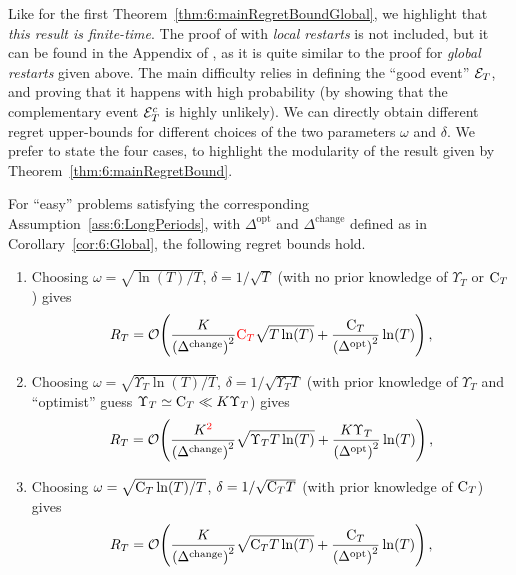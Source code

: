 Like for the first Theorem~\ref{thm:6:mainRegretBoundGlobal},
we highlight that \emph{this result is finite-time}.
The proof of \GLRklUCB{} with \emph{local restarts} is not included, but it can be found in the Appendix of \cite{Besson2019GLRT}, as it is quite similar to the proof for \emph{global restarts} given above. The main difficulty relies in defining the ``good event'' $\mathcal{E}_T$, and proving that it happens with high probability (by showing that the complementary event $\mathcal{E}_T^c$ is highly unlikely).
%
We can directly obtain different regret upper-bounds for different choices of the two parameters $\omega$ and $\delta$.
We prefer to state the four cases, to highlight the modularity of the result given by Theorem~\ref{thm:6:mainRegretBound}.

\begin{corollary}\label{cor:6:Local}
    For ``easy'' problems satisfying the corresponding Assumption~\ref{ass:6:LongPeriods},
    with $\Delta^{\text{opt}}$ and ${\Delta}^{\text{change}}$ defined as in Corollary~\ref{cor:6:Global}, the following regret bounds hold.

    \begin{enumerate}
        \item
        Choosing $\omega = \sqrt{\ln(T) / T}$, $\delta = 1 / \sqrt{T}$ (with no prior knowledge of $\Upsilon_T$ or $\mathrm{C}_T$) gives
        \begin{equation}
            R_T = \mathop{}\mathopen{}\mathcal{O}\mathopen{}\left(\frac{K}{\left(\Delta^{\text{change}}\right)^2} \textcolor{red}{\mathrm{C}_T}\sqrt{T\ln(T)} + \frac{\mathrm{C}_T}{\left(\Delta^{\text{opt}}\right)^2} \ln(T)\right),
        \end{equation}

        \item
        Choosing $\omega = \sqrt{\Upsilon_T\ln(T) / T}$, $\delta = 1 / \sqrt{\Upsilon_T T}$ (with prior knowledge of $\Upsilon_T$ and ``optimist'' guess $\Upsilon_T \simeq \mathrm{C}_T \ll K \Upsilon_T$) gives
        \begin{equation}
            R_T = \mathop{}\mathopen{}\mathcal{O}\mathopen{}\left(\frac{K^{\textcolor{red}{2}}}{\left({\Delta}^{\text{change}}\right)^2}\sqrt{\Upsilon_T T\ln(T)} + \frac{K\Upsilon_T}{\left(\Delta^{\text{opt}}\right)^2}\ln(T)\right),
        \end{equation}

        \item
        Choosing $\omega = \sqrt{\mathrm{C}_T\ln(T) / T}$, $\delta = 1 / \sqrt{\mathrm{C}_T T}$ (with prior knowledge of $\mathrm{C}_T$) gives
        \begin{equation}
            R_T = \mathop{}\mathopen{}\mathcal{O}\mathopen{}\left(\frac{K}{\left({\Delta}^{\text{change}}\right)^2}\sqrt{\mathrm{C}_T T\ln(T)} + \frac{\mathrm{C}_T}{\left(\Delta^{\text{opt}}\right)^2}\ln(T)\right),
        \end{equation}


\end{enumerate}
\end{corollary}
